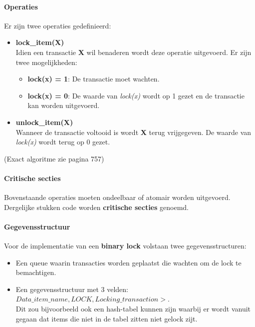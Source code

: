 \paragraph{Operaties} Er zijn twee operaties gedefinieerd:
\begin{itemize}
	\item \textbf{lock\_item(X)}\\  Idien een transactie \textbf{X} wil benaderen wordt deze operatie uitgevoerd. Er zijn twee mogelijkheden:
	\begin{itemize}
		\item \textbf{lock(x) = 1}: De transactie moet wachten.
		\item \textbf{lock(x) = 0}: De waarde van \textit{lock(x)} wordt op 1 gezet en de transactie kan worden uitgevoerd.
	\end{itemize}
	
	\item \textbf{unlock\_item(X)}\\  Wanneer de transactie voltooid is wordt \textbf{X} terug vrijgegeven. De waarde van \textit{lock(x)} wordt terug op 0 gezet.
\end{itemize}
(Exact algoritme zie pagina 757)

\paragraph{Critische secties} Bovenstaande operaties moeten ondeelbaar of atomair worden uitgevoerd. Dergelijke stukken code worden \textbf{critische secties} genoemd.

\paragraph{Gegevensstructuur} Voor de implementatie van een \textbf{binary lock} volstaan twee gegevensstructuren:
\begin{itemize}
	\item Een queue waarin transacties worden geplaatst die wachten om de lock te bemachtigen.
	\item  Een gegevensstructuur met 3 velden: $Data\_item\_name, LOCK, Locking\_transaction>$. \\Dit zou bijvoorbeeld ook een hash-tabel kunnen zijn waarbij er wordt vanuit gegaan dat items die niet in de tabel zitten niet gelock zijt.
\end{itemize}

